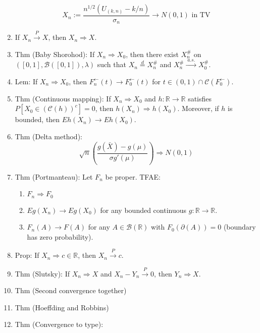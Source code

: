 \documentclass{article}
\newcommand{\as}{\;a.s.\;}
\newcommand{\pto}{\overset{P}{\to}}
\newcommand{\asto}{\overset{\as}{\to}}
\newcommand{\dto}{\Rightarrow}
\newcommand{\deq}{\overset{d}{=}}
\newcommand{\R}{\mathbb{R}}
\newcommand{\C}{\mathcal{C}}
\newcommand{\B}{\mathcal{B}}
\begin{document}
\begin{enumerate}
  \[
    X_n := \frac{n^{1/2} (U_{(k, n)} - k/n)}{\sigma_n} \to N(0,1)
    \text{ in TV}
  \]
\item If $ X_n \pto X$, then $ X_n \dto X$.
\item Thm (Baby Shorohod): If $X_n \Rightarrow X_0$, then there exist
  $X_n^\#$ on $([0,1], \B([0,1]), \lambda)$ such that $X_n \deq X_n^\#$ and $X_n^\# \asto X_0^\#$.
\item Lem: If $X_n \Rightarrow X_0$, then
  $F_n^\leftarrow(t) \to F_0^\leftarrow(t)$ for
  $t \in (0,1) \cap \C(F_0^\leftarrow)$.
\item Thm (Continuous mapping): If $X_n \Rightarrow X_0$ and
  $h: \R \to \R$ satisfies $P[X_0 \in (\C(h))^c] = 0$, then
  $h(X_n) \Rightarrow h(X_0)$. Moreover, if $h$ is bounded, then
  $Eh(X_n)\to Eh(X_0)$.
\item Thm (Delta method):
  \[
    \sqrt{n} \left(\frac{g(\bar{X}) - g(\mu)}{\sigma g'(\mu)} \right)
    \Rightarrow N(0,1)
  \]
\item Thm (Portmanteau): Let $F_n$ be proper. TFAE:
  \begin{enumerate}
  \item $F_n \Rightarrow F_0$
  \item $Eg(X_n) \to Eg(X_0)$ for any bounded continuous
    $g: \R \to \R$.
  \item $F_n(A) \to F(A)$ for any $A \in \B(\R)$ with
    $F_0(\partial(A)) = 0$ (boundary has zero probability).
  \end{enumerate}
\item Prop: If $X_n \dto c \in \R$, then $X_n \pto c$.
\item Thm (Slutsky): If $X_n \dto X$ and $X_n - Y_n \pto 0$, then
  $Y_n \dto X$.
\item Thm (Second convergence together)
\item Thm (Hoeffding and Robbins)
\item Thm (Convergence to type):


\end{enumerate}
\end{document}
